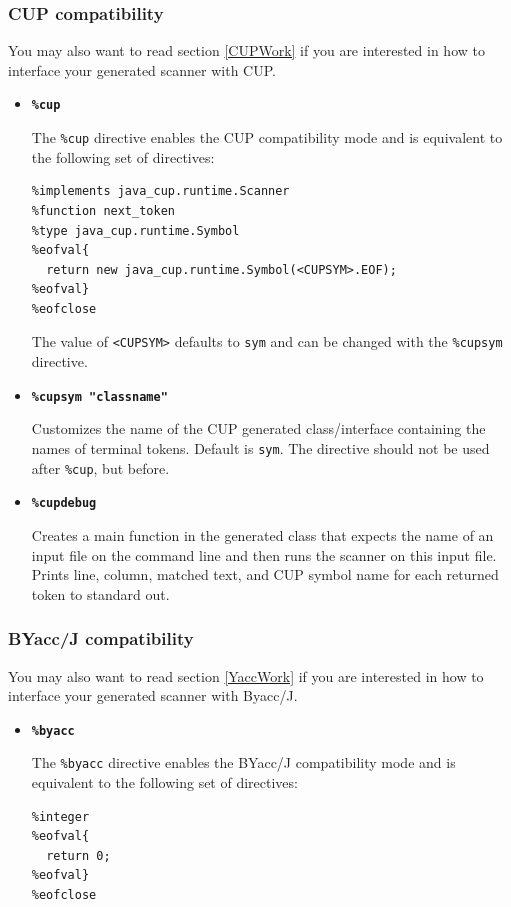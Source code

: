 \documentclass[11pt]{scrartcl}
\begin{document}
\subsubsection{CUP compatibility\label{CupMode}}
You may also want to read section \ref{CUPWork} 
if you are interested in how to interface your generated
scanner with CUP.
\begin{itemize}
\item
{\bf \texttt{\%cup}}

The \texttt{\%cup} directive enables the CUP compatibility mode and is equivalent
to the following set of directives:

\begin{verbatim}
%implements java_cup.runtime.Scanner
%function next_token
%type java_cup.runtime.Symbol
%eofval{
  return new java_cup.runtime.Symbol(<CUPSYM>.EOF);
%eofval}
%eofclose
\end{verbatim}

The value of \texttt{<CUPSYM>} defaults to \texttt{sym} and can be
changed with the \texttt{\%cupsym} directive.

\item
{\bf \texttt{\%cupsym "classname"}}

Customizes the name of the CUP generated class/interface 
containing the names of terminal tokens. Default is \texttt{sym}.
The directive should not be used after \texttt{\%cup}, but before.

\item
{\bf \texttt{\%cupdebug}}

Creates a main function in the generated class that expects the name
of an input file on the command line and then runs the scanner on this
input file. Prints line, column, matched text, and CUP symbol name for
each returned token to standard out.

\end{itemize}

\subsubsection{BYacc/J compatibility\label{YaccMode}}
You may also want to read section \ref{YaccWork} 
if you are interested in how to interface your generated
scanner with Byacc/J.
\begin{itemize}
\item
{\bf \texttt{\%byacc}}

The \texttt{\%byacc} directive enables the BYacc/J compatibility mode and is equivalent
to the following set of directives:

\begin{verbatim}
%integer
%eofval{
  return 0;
%eofval}
%eofclose
\end{verbatim}

\end{itemize}
\end{document}
